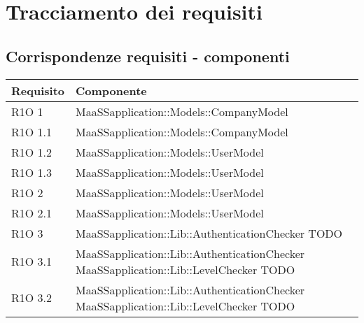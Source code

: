 \section{Tracciamento dei requisiti}
\subsection{Corrispondenze requisiti - componenti}
\begin{center}
  \bgroup
  \def\arraystretch{1.8}
  \begin{longtable}{ | l | p{8cm} |}
    \hline
    \cellcolor[gray]{0.9} \textbf{Requisito} & \cellcolor[gray]{0.9} \textbf{Componente} \\ \hline
    
    R1O 1 & MaaSSapplication::Models::CompanyModel \newline  \\ \hline
    
    R1O 1.1 & MaaSSapplication::Models::CompanyModel \newline  \\ \hline
    
    R1O 1.2 & MaaSSapplication::Models::UserModel \newline  \\ \hline
    
    R1O 1.3 & MaaSSapplication::Models::UserModel \newline  \\ \hline
    
    R1O 2 & MaaSSapplication::Models::UserModel \newline  \\ \hline

	R1O 2.1 & MaaSSapplication::Models::UserModel \newline  \\ \hline
	
	R1O 3 & MaaSSapplication::Lib::AuthenticationChecker TODO  \newline  \\ \hline
	
	R1O 3.1 & MaaSSapplication::Lib::AuthenticationChecker \newline MaaSSapplication::Lib::LevelChecker TODO  \newline  \\ \hline
	
	R1O 3.2 & MaaSSapplication::Lib::AuthenticationChecker \newline MaaSSapplication::Lib::LevelChecker TODO  \newline  \\ \hline
	

\end{longtable}
\end{center}
